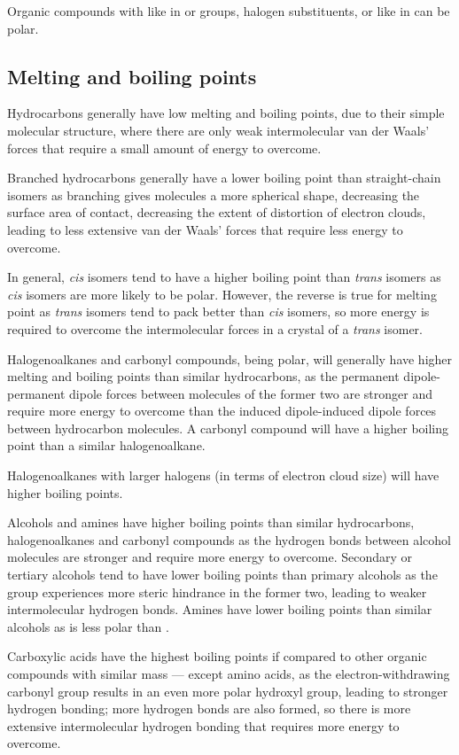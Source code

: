 \documentclass[Chemistry.tex]{subfiles}
\begin{document}
Organic compounds with  like in  or  groups, halogen substituents, or  like in  can be polar.
\subsection{Melting and boiling points}
Hydrocarbons generally have low melting and boiling points, due to their simple molecular structure, where there are only weak intermolecular van der Waals' forces that require a small amount of energy to overcome.

Branched hydrocarbons generally have a lower boiling point than straight-chain isomers as branching gives molecules a more spherical shape, decreasing the surface area of contact, decreasing the extent of distortion of electron clouds, leading to less extensive van der Waals' forces that require less energy to overcome.

In general, \emph{cis} isomers tend to have a higher boiling point than \emph{trans} isomers as \emph{cis} isomers are more likely to be polar. However, the reverse is true for melting point as \emph{trans} isomers tend to pack better than \emph{cis} isomers, so more energy is required to overcome the intermolecular forces in a crystal of a \emph{trans} isomer.

Halogenoalkanes and carbonyl compounds, being polar, will generally have higher melting and boiling points than similar hydrocarbons, as the permanent dipole-permanent dipole forces between molecules of the former two are stronger and require more energy to overcome than the induced dipole-induced dipole forces between hydrocarbon molecules. A carbonyl compound will have a higher boiling point than a similar halogenoalkane.

Halogenoalkanes with larger halogens (in terms of electron cloud size) will have higher boiling points.

Alcohols and amines have higher boiling points than similar hydrocarbons, halogenoalkanes and carbonyl compounds as the hydrogen bonds between alcohol molecules are stronger and require more energy to overcome. Secondary or tertiary alcohols tend to have lower boiling points than primary alcohols as the  group experiences more steric hindrance in the former two, leading to weaker intermolecular hydrogen bonds. Amines have lower boiling points than similar alcohols as  is less polar than .

Carboxylic acids have the highest boiling points if compared to other organic compounds with similar mass --- except amino acids, as the electron-withdrawing carbonyl group results in an even more polar hydroxyl group, leading to stronger hydrogen bonding; more hydrogen bonds are also formed, so there is more extensive intermolecular hydrogen bonding that requires more energy to overcome.
\end{document}
